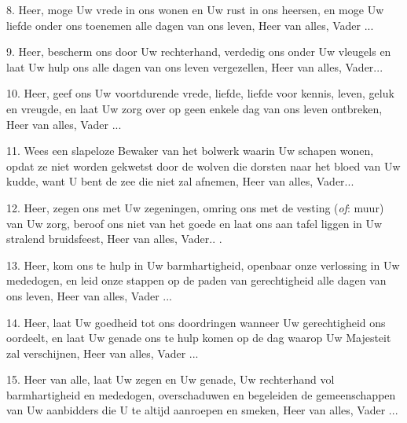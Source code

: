 \documentclass[12pt,twoside,a5paper]{article}
\newlength{\origparskip}
\newenvironment{halfparskip}{
  \setlength{\parskip}{0.5\origparskip}
}{
  \setlength{\parskip}{\origparskip}
}
\begin{document}
\begin{halfparskip}
  8. Heer, moge Uw vrede in ons wonen en Uw rust in ons heersen, en moge Uw liefde onder ons toenemen alle dagen van ons leven, Heer van alles, Vader ...

  9. Heer, bescherm ons door Uw rechterhand, verdedig ons onder Uw vleugels en laat Uw hulp ons alle dagen van ons leven vergezellen, Heer van alles, Vader...

  10. Heer, geef ons Uw voortdurende vrede, liefde, liefde voor kennis, leven, geluk en vreugde, en laat Uw zorg over op geen enkele dag van ons leven ontbreken, Heer van alles, Vader ...

  11. Wees een slapeloze Bewaker van het bolwerk waarin Uw schapen wonen, opdat ze niet worden gekwetst door de wolven die dorsten naar het bloed van Uw kudde, want U bent de zee die niet zal afnemen, Heer van alles, Vader...

  12. Heer, zegen ons met Uw zegeningen, omring ons met de vesting (\emph{of}: muur) van Uw zorg, beroof ons niet van het goede en laat ons aan tafel liggen in Uw stralend bruidsfeest, Heer van alles, Vader.. .

  13. Heer, kom ons te hulp in Uw barmhartigheid, openbaar onze verlossing in Uw mededogen, en leid onze stappen op de paden van gerechtigheid alle dagen van ons leven, Heer van alles, Vader ...

  14. Heer, laat Uw goedheid tot ons doordringen wanneer Uw gerechtigheid ons oordeelt, en laat Uw genade ons te hulp komen op de dag waarop Uw Majesteit zal verschijnen, Heer van alles, Vader ...

  15. Heer van alle, laat Uw zegen en Uw genade, Uw rechterhand vol barmhartigheid en mededogen, overschaduwen en begeleiden de gemeenschappen van Uw aanbidders die U te altijd aanroepen en smeken, Heer van alles, Vader ...
\end{halfparskip}
\end{document}
